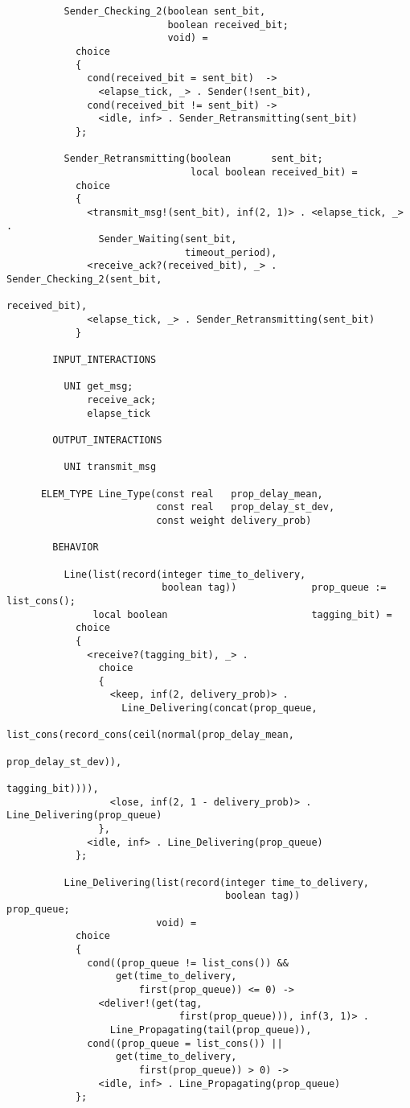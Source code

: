 \begin{verbatim}
          Sender_Checking_2(boolean sent_bit,
                            boolean received_bit;
                            void) =
            choice
            {
              cond(received_bit = sent_bit)  ->
                <elapse_tick, _> . Sender(!sent_bit),
              cond(received_bit != sent_bit) ->
                <idle, inf> . Sender_Retransmitting(sent_bit)
            };

          Sender_Retransmitting(boolean       sent_bit;
                                local boolean received_bit) =
            choice
            {
              <transmit_msg!(sent_bit), inf(2, 1)> . <elapse_tick, _> .
                Sender_Waiting(sent_bit,
                               timeout_period),
              <receive_ack?(received_bit), _> . Sender_Checking_2(sent_bit,
                                                                  received_bit),
              <elapse_tick, _> . Sender_Retransmitting(sent_bit)
            }

        INPUT_INTERACTIONS

          UNI get_msg;
              receive_ack;
              elapse_tick

        OUTPUT_INTERACTIONS

          UNI transmit_msg

      ELEM_TYPE Line_Type(const real   prop_delay_mean,
                          const real   prop_delay_st_dev,
                          const weight delivery_prob)

        BEHAVIOR

          Line(list(record(integer time_to_delivery,
                           boolean tag))             prop_queue := list_cons();
               local boolean                         tagging_bit) =
            choice
            {
              <receive?(tagging_bit), _> .
                choice
                {
                  <keep, inf(2, delivery_prob)> .
                    Line_Delivering(concat(prop_queue,
                                           list_cons(record_cons(ceil(normal(prop_delay_mean,
                                                                             prop_delay_st_dev)),
                                                                 tagging_bit)))),
                  <lose, inf(2, 1 - delivery_prob)> . Line_Delivering(prop_queue)
                },
              <idle, inf> . Line_Delivering(prop_queue)
            };

          Line_Delivering(list(record(integer time_to_delivery,
                                      boolean tag))             prop_queue;
                          void) =
            choice
            {
              cond((prop_queue != list_cons()) &&
                   get(time_to_delivery,
                       first(prop_queue)) <= 0) ->
                <deliver!(get(tag,
                              first(prop_queue))), inf(3, 1)> .
                  Line_Propagating(tail(prop_queue)),
              cond((prop_queue = list_cons()) ||
                   get(time_to_delivery,
                       first(prop_queue)) > 0) ->
                <idle, inf> . Line_Propagating(prop_queue)
            };


\end{verbatim}
